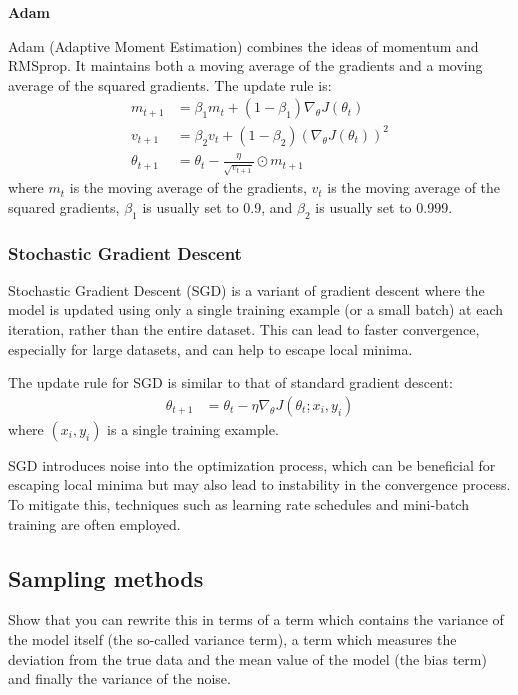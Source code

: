 \documentclass[amssymb,twocolumn,aps]{revtex4}
\begin{document}
\textbf{Adam}

Adam (Adaptive Moment Estimation) combines the ideas of momentum and RMSprop. It maintains both a moving average of the gradients and a moving average of the squared gradients. The update rule is:
\begin{align*}
m_{t+1} &= \beta_1 m_t + (1 - \beta_1) \nabla_{\theta} J(\theta_t) \\
v_{t+1} &= \beta_2 v_t + (1 - \beta_2) (\nabla_{\theta} J(\theta_t))^2 \\
\theta_{t+1} &= \theta_t - \frac{\eta}{\sqrt{v_{t+1}}} \odot m_{t+1}
\end{align*}
where $m_t$ is the moving average of the gradients, $v_t$ is the moving average of the squared gradients, $\beta_1$ is usually set to 0.9, and $\beta_2$ is usually set to 0.999.

\subsubsection{Stochastic Gradient Descent}
Stochastic Gradient Descent (SGD) is a variant of gradient descent where the model is updated using only a single training example (or a small batch) at each iteration, rather than the entire dataset. This can lead to faster convergence, especially for large datasets, and can help to escape local minima.

The update rule for SGD is similar to that of standard gradient descent:
\begin{align*}
\theta_{t+1} &= \theta_t - \eta \nabla_{\theta} J(\theta_t; x_i, y_i)
\end{align*}
where $(x_i, y_i)$ is a single training example.

SGD introduces noise into the optimization process, which can be beneficial for escaping local minima but may also lead to instability in the convergence process. To mitigate this, techniques such as learning rate schedules and mini-batch training are often employed.

\subsection{Sampling methods}

Show that you can rewrite this in terms of a term which contains the variance of the model itself
(the so-called variance term), a term which measures the deviation from the true data and the mean
value of the model (the bias term) and finally the variance of the noise.
\end{document}
